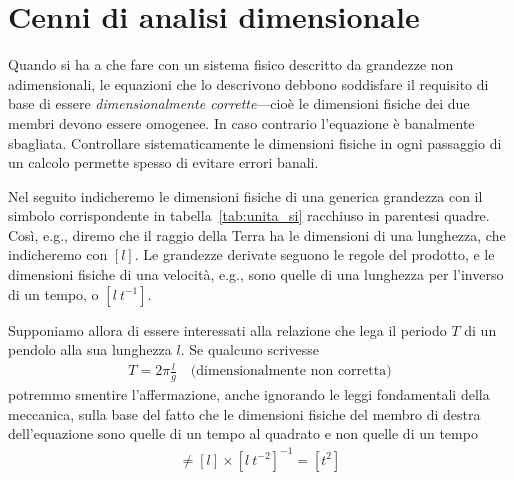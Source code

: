\section{Cenni di analisi dimensionale}
\label{sec:calcolo_dimensionale}

Quando si ha a che fare con un sistema fisico descritto da grandezze non
adimensionali, le equazioni che lo descrivono debbono soddisfare il requisito
di base di essere \emph{dimensionalmente corrette}---cioè le dimensioni
fisiche dei due membri devono essere omogenee. In caso contrario l'equazione
è banalmente sbagliata. Controllare sistematicamente le dimensioni fisiche
in ogni passaggio di un calcolo permette spesso di evitare errori banali.

Nel seguito indicheremo le dimensioni fisiche di una generica grandezza
con il simbolo corrispondente in tabella~\ref{tab:unita_si} racchiuso in
parentesi quadre. Così, e.g.,  diremo che il raggio della Terra ha le
dimensioni di una lunghezza, che indicheremo con $[l]$. Le grandezze derivate
seguono le regole del prodotto, e le dimensioni fisiche di una velocità,
e.g., sono quelle di una lunghezza per l'inverso di un tempo, o $[l~t^{-1}]$.

Supponiamo allora di essere interessati alla relazione che lega il periodo
$T$ di un pendolo alla sua lunghezza $l$. Se qualcuno scrivesse
\begin{align*}
  T = 2\pi \frac{l}{g} \quad \text{(dimensionalmente non corretta)}
\end{align*}
potremmo smentire l'affermazione, anche ignorando le leggi fondamentali della
meccanica, sulla base del fatto che le dimensioni fisiche del membro di destra
dell'equazione sono quelle di un tempo al quadrato e non quelle di un tempo
\begin{align*}
  [t] \neq [l] \times [l~t^{-2}]^{-1} = [t^{2}]
\end{align*}


